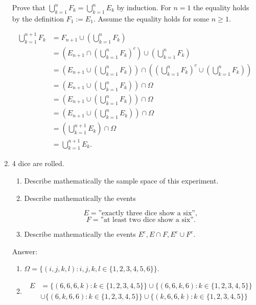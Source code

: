 \documentclass{article}
\begin{document}
\begin{enumerate}
Prove that $\bigcup_{k=1}^n F_k  = \bigcup_{k=1}^n E_k$ by induction. For $n = 1$ the equality holds by the definition $F_1 := E_1$. Assume the equality holds for some $n\geq 1$.

\begin{align*}
\bigcup_{k=1}^{n+1} F_k &= F_{n+1} \cup \left(\bigcup_{k=1}^n F_k\right) \\
&= \left( E_{n+1} \cap \left(\bigcup_{k=1}^{n} F_k\right)^c \right)\cup \left(\bigcup_{k=1}^n F_k\right) \\
&= \left( E_{n+1}  \cup \left(\bigcup_{k=1}^{n} F_k\right) \right)\cap \left(\left(\bigcup_{k=1}^{n} F_k\right)^c \cup \left(\bigcup_{k=1}^n F_k\right)\right) \\
&= \left( E_{n+1}  \cup \left(\bigcup_{k=1}^{n} F_k\right) \right)\cap \Omega \\
&= \left( E_{n+1}  \cup \left(\bigcup_{k=1}^{n} F_k\right) \right)\cap \Omega \\
&= \left( E_{n+1}  \cup \left(\bigcup_{k=1}^{n} E_k\right) \right)\cap \Omega \\
&= \left(\bigcup_{k=1}^{n+1} E_k \right)\cap \Omega \\
&= \bigcup_{k=1}^{n+1} E_k.
\end{align*}

\newpage

\item 

4 dice are rolled.

\begin{enumerate}
\item Describe mathematically the sample space of this experiment.

\item Describe mathematically the events

$$ E = \text{”exactly three dice show a six”},$$
$$ F = \text{”at least two dice show a six”}. $$

\item Describe mathematically the events $E^c, E\cap F,  E^c \cup F^c$. 
\end{enumerate}

Answer:

\begin{enumerate}
\item $\Omega = \{(i,j,k,l) : i,j,k,l \in \{1,2,3,4,5,6\}\}$.

\item 
\begin{align*}
E &= \{(6,6,6,k) : k \in \{1,2,3,4,5\}\}
\cup \{(6,6,k,6) : k \in \{1,2,3,4,5\}\} \\
&\cup \{(6,k,6,6) : k \in \{1,2,3,4,5\}\} 
\cup \{(k,6,6,k) : k \in \{1,2,3,4,5\}\}
\end{align*}


\end{enumerate}
\end{enumerate}
\end{document}
